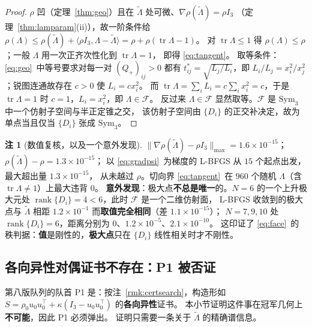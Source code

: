 \documentclass[UTF8,11pt]{ctexart}
\theoremstyle{definition}
\newtheorem{remark}[theorem]{注}
\newcommand{\Lam}{\Lambda}
\newcommand{\tr}{\operatorname{tr}}
\begin{document}
\begin{proof}
$\rho$ 凹（定理~\ref{thm:geo}）且在 $\tilde\Lam$ 处可微、$\nabla\rho(\tilde\Lam)=\rho I_3$
（定理~\ref{thm:lamparam}(ii)），故一阶条件给
$\rho(\Lam)\le\rho(\tilde\Lam)+\langle\rho I_3,\Lam-\tilde\Lam\rangle=\rho+\rho(\tr\Lam-1)$。
对 $\tr\Lam\le1$ 得 $\rho(\Lam)\le\rho$；一般 $\Lam$ 用一次正齐次性化到 $\tr\Lam=1$，
即得 \eqref{eq:tangent}。
取等条件：\eqref{eq:geo}~中等号要求对每一对 $(Q_+)_{ij}>0$ 都有
$t^*_{ij}=\sqrt{L_j/L_i}$，即 $L_i/L_j=x_i^2/x_j^2$；锐图连通故存在 $c>0$ 使 $L_i=cx_i^2$。
而 $\tr\Lam=\sum_iL_i=c\sum_ix_i^2=c$，于是 $\tr\Lam=1$ 时 $c=1$，$L_i=x_i^2$，即 $\Lam\in\mathcal F$。
反过来 $\Lam\in\mathcal F$ 显然取等。$\mathcal F$ 是 $\mathrm{Sym}_3$ 中一个仿射子空间与半正定锥之交，
该仿射子空间由 $\{D_i\}$ 的正交补决定，故为单点当且仅当 $\{D_i\}$ 张成 $\mathrm{Sym}_3$。
\end{proof}

\begin{remark}[数值复核，以及一个意外发现]\label{rmk:argmax}
$\|\nabla\rho(\tilde\Lam)-\rho I_3\|_{\max}=1.6\times10^{-15}$；
$\rho(\tilde\Lam)-\rho=1.3\times10^{-15}$；
以 \eqref{eq:gradpsi}~为梯度的 L-BFGS 从 $15$ 个起点出发，最大超出量 $1.3\times10^{-15}$，
从未越过 $\rho$。切向界 \eqref{eq:tangent}~在 $960$ 个随机 $\Lam$（含 $\tr\Lam\ne1$）上最大违背 $0$。
\textbf{意外发现}：极大点\textbf{不总是唯一}的。$N=6$ 的一个上升极大元处
$\operatorname{rank}\{D_i\}=4<6$，此时 $\mathcal F$ 是一个二维仿射面，
L-BFGS 收敛到的极大点与 $\tilde\Lam$ 相距 $1.2\times10^{-1}$ 而\textbf{取值完全相同}（差 $1.1\times10^{-15}$）；
$N=7,9,10$ 处 $\operatorname{rank}\{D_i\}=6$，距离分别为 $0$、$1.2\times10^{-5}$、$2.1\times10^{-10}$。
这印证了 \eqref{eq:face}~的秩判据：\textbf{值}是刚性的，\textbf{极大点}只在 $\{D_i\}$ 线性相关时才不刚性。
\end{remark}

\subsection{各向异性对偶证书不存在：P1 被否证}\label{sec:r19:p1dead}

第八版队列的队首 P1 是：按注~\ref{rmk:certsearch}，构造形如
$S=\rho_0u_0u_0^\top+\kappa(I_3-u_0u_0^\top)$ 的\textbf{各向异性}证书。
本小节证明这件事在冠军几何上\textbf{不可能}，因此 P1 必须弹出。
证明只需要一条关于 $\tilde\Lam$ 的精确谱信息。
\end{document}

